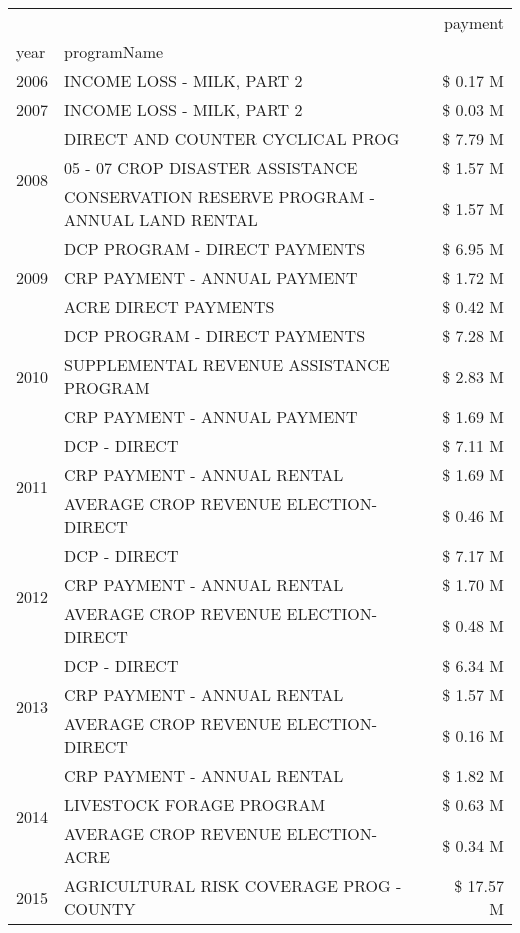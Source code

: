 \begin{tabular}{llr}
\toprule
 &  & payment \\
year & programName &  \\
\midrule
2006 & INCOME LOSS - MILK, PART 2 & \$ 0.17 M \\
\cline{1-3}
2007 & INCOME LOSS - MILK, PART 2 & \$ 0.03 M \\
\cline{1-3}
\multirow[t]{3}{*}{2008} & DIRECT AND COUNTER CYCLICAL PROG & \$ 7.79 M \\
 & 05 - 07 CROP DISASTER ASSISTANCE & \$ 1.57 M \\
 & CONSERVATION RESERVE PROGRAM - ANNUAL LAND RENTAL & \$ 1.57 M \\
\cline{1-3}
\multirow[t]{3}{*}{2009} & DCP PROGRAM - DIRECT PAYMENTS & \$ 6.95 M \\
 & CRP PAYMENT - ANNUAL PAYMENT & \$ 1.72 M \\
 & ACRE DIRECT PAYMENTS & \$ 0.42 M \\
\cline{1-3}
\multirow[t]{3}{*}{2010} & DCP PROGRAM - DIRECT PAYMENTS & \$ 7.28 M \\
 & SUPPLEMENTAL REVENUE ASSISTANCE PROGRAM & \$ 2.83 M \\
 & CRP PAYMENT - ANNUAL PAYMENT & \$ 1.69 M \\
\cline{1-3}
\multirow[t]{3}{*}{2011} & DCP - DIRECT & \$ 7.11 M \\
 & CRP PAYMENT - ANNUAL RENTAL & \$ 1.69 M \\
 & AVERAGE CROP REVENUE ELECTION-DIRECT & \$ 0.46 M \\
\cline{1-3}
\multirow[t]{3}{*}{2012} & DCP - DIRECT & \$ 7.17 M \\
 & CRP PAYMENT - ANNUAL RENTAL & \$ 1.70 M \\
 & AVERAGE CROP REVENUE ELECTION-DIRECT & \$ 0.48 M \\
\cline{1-3}
\multirow[t]{3}{*}{2013} & DCP - DIRECT & \$ 6.34 M \\
 & CRP PAYMENT - ANNUAL RENTAL & \$ 1.57 M \\
 & AVERAGE CROP REVENUE ELECTION-DIRECT & \$ 0.16 M \\
\cline{1-3}
\multirow[t]{3}{*}{2014} & CRP PAYMENT - ANNUAL RENTAL & \$ 1.82 M \\
 & LIVESTOCK FORAGE PROGRAM & \$ 0.63 M \\
 & AVERAGE CROP REVENUE ELECTION-ACRE & \$ 0.34 M \\
\cline{1-3}
\multirow[t]{3}{*}{2015} & AGRICULTURAL RISK COVERAGE PROG - COUNTY & \$ 17.57 M \\

\end{tabular}
